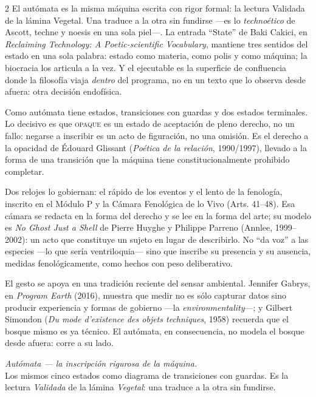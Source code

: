 \documentclass[11pt]{article}
\newcommand{\noet}[1]{{\itshape #1}}
\begin{document}
\begin{multicols}{2}\small\setlength{\parindent}{1em}\setlength{\parskip}{0.45em}
El autómata es la misma máquina escrita con rigor formal: la lectura Validada de la lámina Vegetal. Una traduce a la otra sin fundirse —es lo \emph{technoético} de Ascott, techne y noesis en una sola piel—. La entrada ``State'' de Baki Cakici, en \emph{Reclaiming Technology: A Poetic-scientific Vocabulary}, mantiene tres sentidos del estado en una sola palabra: estado como materia, como polis y como máquina; la biocracia los articula a la vez. Y el ejecutable es la superficie de confluencia donde la filosofía viaja \emph{dentro} del programa, no en un texto que lo observa desde afuera: otra decisión endofísica.

Como autómata tiene estados, transiciones con guardas y dos estados terminales. Lo decisivo es que \textsc{opaque} es un estado de aceptación de pleno derecho, no un fallo: negarse a inscribir es un acto de figuración, no una omisión. Es el derecho a la opacidad de Édouard Glissant (\emph{Poética de la relación}, 1990/1997), llevado a la forma de una transición que la máquina tiene constitucionalmente prohibido completar.

Dos relojes lo gobiernan: el rápido de los eventos y el lento de la fenología, inscrito en el Módulo P y la Cámara Fenológica de lo Vivo (Arts. 41--48). Esa cámara se redacta en la forma del derecho y se lee en la forma del arte; su modelo es \emph{No Ghost Just a Shell} de Pierre Huyghe y Philippe Parreno (Annlee, 1999--2002): un acto que constituye un sujeto en lugar de describirlo. No ``da voz'' a las especies —lo que sería ventriloquia— sino que inscribe su presencia y su ausencia, medidas fenológicamente, como hechos con peso deliberativo.

El gesto se apoya en una tradición reciente del sensar ambiental. Jennifer Gabrys, en \emph{Program Earth} (2016), muestra que medir no es sólo capturar datos sino producir experiencia y formas de gobierno —la \emph{environmentality}—; y Gilbert Simondon (\emph{Du mode d'existence des objets techniques}, 1958) recuerda que el bosque mismo es ya técnico. El autómata, en consecuencia, no modela el bosque desde afuera: corre a su lado.
\end{multicols}

\newpage
{\large\itshape Autómata — la inscripción rigurosa de la máquina.}\\[-0.3em]
{\small\color{ink!60}Los mismos cinco estados como diagrama de transiciones con guardas. Es la lectura \noet{Validada} de la lámina \noet{Vegetal}: una traduce a la otra sin fundirse.}
\end{document}
